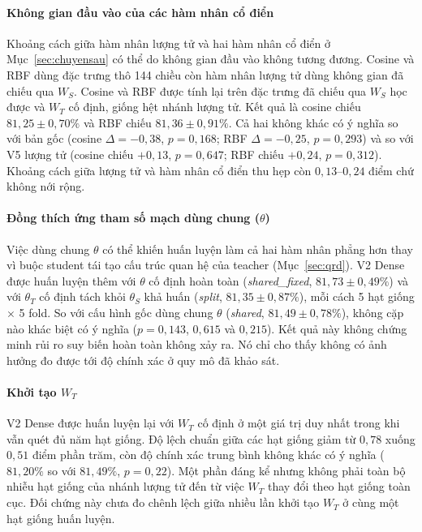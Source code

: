 \paragraph{Không gian đầu vào của các hàm nhân cổ điển}

Khoảng cách giữa hàm nhân lượng tử và hai hàm nhân cổ điển ở
Mục~\ref{sec:chuyensau} có thể do không gian đầu vào không tương đương. Cosine
và RBF dùng đặc trưng thô 144 chiều còn hàm nhân lượng tử dùng không gian đã
chiếu qua $W_S$. Cosine và RBF được tính lại trên đặc trưng đã chiếu qua $W_S$ học được và
$W_T$ cố định, giống hệt nhánh lượng tử. Kết quả là cosine chiếu $81{,}25\pm0{,}70\%$ và RBF chiếu $81{,}36\pm0{,}91\%$. Cả hai
không khác có ý nghĩa so với bản gốc (cosine $\Delta=-0{,}38$, $p=0{,}168$;
RBF $\Delta=-0{,}25$, $p=0{,}293$) và so với V5 lượng tử (cosine chiếu
$+0{,}13$, $p=0{,}647$; RBF chiếu $+0{,}24$, $p=0{,}312$). Khoảng cách giữa
lượng tử và hàm nhân cổ điển thu hẹp còn $0{,}13$--$0{,}24$ điểm chứ không
nới rộng.

\paragraph{Đồng thích ứng tham số mạch dùng chung ($\theta$)}

Việc dùng chung $\theta$ có thể khiến huấn luyện làm cả hai hàm nhân phẳng
hơn thay vì buộc student tái tạo cấu trúc quan hệ của teacher
(Mục~\ref{sec:qrd}). V2 Dense được huấn luyện thêm với $\theta$ cố định
hoàn toàn (\emph{shared\_fixed}, $81{,}73\pm0{,}49\%$) và với $\theta_T$
cố định tách khỏi $\theta_S$ khả huấn (\emph{split}, $81{,}35\pm0{,}87\%$),
mỗi cách 5 hạt giống $\times$ 5 fold. So với cấu hình gốc dùng chung
$\theta$ (\emph{shared}, $81{,}49\pm0{,}78\%$), không cặp nào khác biệt có
ý nghĩa ($p=0{,}143$, $0{,}615$ và $0{,}215$). Kết quả này không chứng minh
rủi ro suy biến hoàn toàn không xảy ra. Nó chỉ cho thấy không có ảnh hưởng
đo được tới độ chính xác ở quy mô đã khảo sát.

\paragraph{Khởi tạo $W_T$}

V2 Dense được huấn luyện lại với $W_T$ cố định ở một giá trị duy nhất trong
khi vẫn quét đủ năm hạt giống. Độ lệch chuẩn giữa các hạt giống giảm từ
$0{,}78$ xuống $0{,}51$ điểm phần trăm, còn độ chính xác trung bình không
khác có ý nghĩa ($81{,}20\%$ so với $81{,}49\%$, $p = 0{,}22$). Một phần
đáng kể nhưng không phải toàn bộ nhiễu hạt giống của nhánh lượng tử đến từ
việc $W_T$ thay đổi theo hạt giống toàn cục. Đối chứng này chưa đo chênh
lệch giữa nhiều lần khởi tạo $W_T$ ở cùng một hạt giống huấn luyện.

